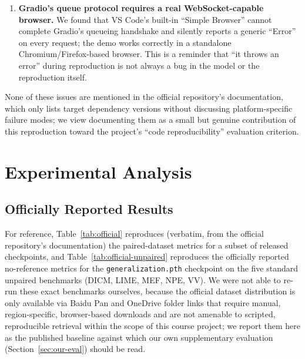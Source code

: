 \documentclass[conference]{IEEEtran}
\begin{document}
\begin{enumerate}
  repository ships a \texttt{Readme.md}; on Windows, this collides with a
  conventionally-named \texttt{README.md}, so we renamed the original to
  \texttt{ORIGINAL\_README.md} before adding our own.
  \item \textbf{Gradio's queue protocol requires a real WebSocket-capable
  browser.} We found that VS Code's built-in ``Simple Browser'' cannot
  complete Gradio's queueing handshake and silently reports a generic
  ``Error'' on every request; the demo works correctly in a standalone
  Chromium/Firefox-based browser. This is a reminder that ``it throws an
  error'' during reproduction is not always a bug in the model or the
  reproduction itself.
\end{enumerate}

None of these issues are mentioned in the official repository's
documentation, which only lists target dependency versions without
discussing platform-specific failure modes; we view documenting them as a
small but genuine contribution of this reproduction toward the project's
``code reproducibility'' evaluation criterion.

\section{Experimental Analysis}
\label{sec:exp}

\subsection{Officially Reported Results}
For reference, Table~\ref{tab:official} reproduces (verbatim, from the
official repository's documentation) the paired-dataset metrics for a subset
of released checkpoints, and Table~\ref{tab:official-unpaired} reproduces the
officially reported no-reference metrics for the \texttt{generalization.pth}
checkpoint on the five standard unpaired benchmarks (DICM, LIME, MEF, NPE,
VV). We were not able to re-run these exact benchmarks ourselves, because the
official dataset distribution is only available via Baidu Pan and OneDrive
folder links that require manual, region-specific, browser-based downloads
and are not amenable to scripted, reproducible retrieval within the scope of
this course project; we report them here as the published baseline against
which our own supplementary evaluation (Section~\ref{sec:our-eval}) should be
read.
\end{document}
